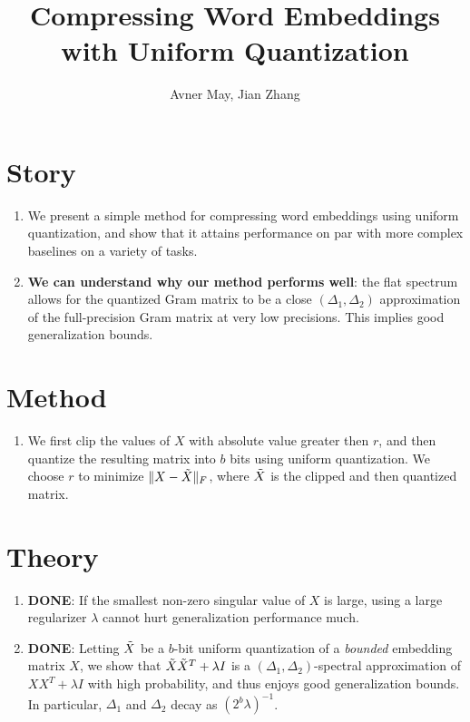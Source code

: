 \documentclass[12pt]{article}
\begin{document}
\title{Compressing Word Embeddings with Uniform Quantization}
\author{Avner May, Jian Zhang}
\onehalfspacing
\maketitle

\section{Story}
\begin{enumerate}
	\item We present a simple method for compressing word embeddings using uniform quantization, and show that it attains performance on par with more complex baselines on a variety of tasks.
	\item \textbf{We can understand why our method performs well}: the flat spectrum allows for the quantized Gram matrix to be a close $(\Delta_1,\Delta_2)$ approximation of the full-precision Gram matrix at very low precisions.
	This implies good generalization bounds.
\end{enumerate}

\section{Method}
\begin{enumerate}
	\item We first clip the values of $X$ with absolute value greater then $r$, and then quantize the resulting matrix into $b$ bits using uniform quantization.
	We choose $r$ to minimize $\|X-\tX\|_F$, where $\tX$ is the clipped and then quantized matrix.
\end{enumerate}
\section{Theory}
\begin{enumerate}
	\item \textbf{DONE}: If the smallest non-zero singular value of $X$ is large, using a large regularizer $\lambda$ cannot hurt generalization performance much.
	\item \textbf{DONE}: Letting $\tX$ be a $b$-bit uniform quantization of a \textit{bounded} embedding matrix $X$, we show that $\tX \tX^T + \lambda I$ is a $(\Delta_1,\Delta_2)$-spectral approximation of $XX^T + \lambda I$ with high probability, and thus enjoys good generalization bounds.
	In particular, $\Delta_1$ and $\Delta_2$ decay as $(2^b \lambda)^{-1}$.	
\end{enumerate}
\end{document}
